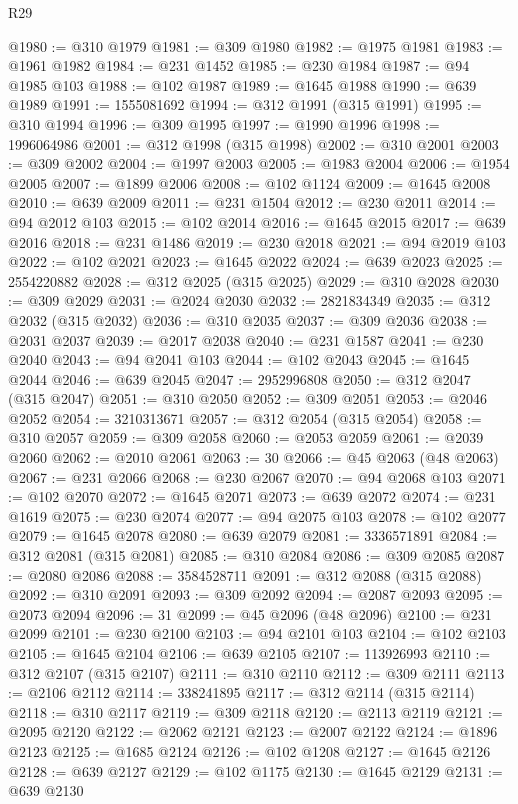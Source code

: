\begin{lexlean}{R29}
\begin{coremodule}
@1980 := @310 @1979
@1981 := @309 @1980
@1982 := @1975 @1981
@1983 := @1961 @1982
@1984 := @231 @1452
@1985 := @230 @1984
@1987 := @94 @1985 @103
@1988 := @102 @1987
@1989 := @1645 @1988
@1990 := @639 @1989
@1991 := 1555081692
@1994 := @312 @1991 (@315 @1991)
@1995 := @310 @1994
@1996 := @309 @1995
@1997 := @1990 @1996
@1998 := 1996064986
@2001 := @312 @1998 (@315 @1998)
@2002 := @310 @2001
@2003 := @309 @2002
@2004 := @1997 @2003
@2005 := @1983 @2004
@2006 := @1954 @2005
@2007 := @1899 @2006
@2008 := @102 @1124
@2009 := @1645 @2008
@2010 := @639 @2009
@2011 := @231 @1504
@2012 := @230 @2011
@2014 := @94 @2012 @103
@2015 := @102 @2014
@2016 := @1645 @2015
@2017 := @639 @2016
@2018 := @231 @1486
@2019 := @230 @2018
@2021 := @94 @2019 @103
@2022 := @102 @2021
@2023 := @1645 @2022
@2024 := @639 @2023
@2025 := 2554220882
@2028 := @312 @2025 (@315 @2025)
@2029 := @310 @2028
@2030 := @309 @2029
@2031 := @2024 @2030
@2032 := 2821834349
@2035 := @312 @2032 (@315 @2032)
@2036 := @310 @2035
@2037 := @309 @2036
@2038 := @2031 @2037
@2039 := @2017 @2038
@2040 := @231 @1587
@2041 := @230 @2040
@2043 := @94 @2041 @103
@2044 := @102 @2043
@2045 := @1645 @2044
@2046 := @639 @2045
@2047 := 2952996808
@2050 := @312 @2047 (@315 @2047)
@2051 := @310 @2050
@2052 := @309 @2051
@2053 := @2046 @2052
@2054 := 3210313671
@2057 := @312 @2054 (@315 @2054)
@2058 := @310 @2057
@2059 := @309 @2058
@2060 := @2053 @2059
@2061 := @2039 @2060
@2062 := @2010 @2061
@2063 := 30
@2066 := @45 @2063 (@48 @2063)
@2067 := @231 @2066
@2068 := @230 @2067
@2070 := @94 @2068 @103
@2071 := @102 @2070
@2072 := @1645 @2071
@2073 := @639 @2072
@2074 := @231 @1619
@2075 := @230 @2074
@2077 := @94 @2075 @103
@2078 := @102 @2077
@2079 := @1645 @2078
@2080 := @639 @2079
@2081 := 3336571891
@2084 := @312 @2081 (@315 @2081)
@2085 := @310 @2084
@2086 := @309 @2085
@2087 := @2080 @2086
@2088 := 3584528711
@2091 := @312 @2088 (@315 @2088)
@2092 := @310 @2091
@2093 := @309 @2092
@2094 := @2087 @2093
@2095 := @2073 @2094
@2096 := 31
@2099 := @45 @2096 (@48 @2096)
@2100 := @231 @2099
@2101 := @230 @2100
@2103 := @94 @2101 @103
@2104 := @102 @2103
@2105 := @1645 @2104
@2106 := @639 @2105
@2107 := 113926993
@2110 := @312 @2107 (@315 @2107)
@2111 := @310 @2110
@2112 := @309 @2111
@2113 := @2106 @2112
@2114 := 338241895
@2117 := @312 @2114 (@315 @2114)
@2118 := @310 @2117
@2119 := @309 @2118
@2120 := @2113 @2119
@2121 := @2095 @2120
@2122 := @2062 @2121
@2123 := @2007 @2122
@2124 := @1896 @2123
@2125 := @1685 @2124
@2126 := @102 @1208
@2127 := @1645 @2126
@2128 := @639 @2127
@2129 := @102 @1175
@2130 := @1645 @2129
@2131 := @639 @2130

\end{coremodule}
\end{lexlean}
